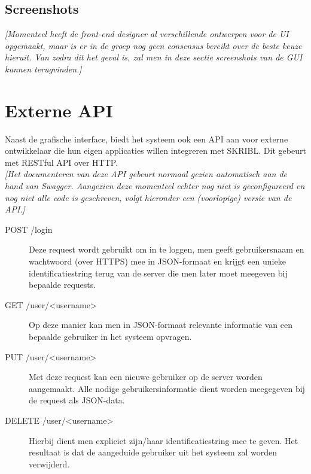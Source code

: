\documentclass{article}
\begin{document}
\subsection{Screenshots}

\textit{[Momenteel heeft de front-end designer al verschillende ontwerpen voor de UI opgemaakt, maar is er in de groep nog geen consensus bereikt over de beste keuze hieruit. Van zodra dit het geval is, zal men in deze sectie screenshots van de GUI kunnen terugvinden.]}

\clearpage

\section{Externe API}

Naast de grafische interface, biedt het systeem ook een API aan voor externe ontwikkelaar die hun eigen applicaties willen integreren met SKRIBL. Dit gebeurt met RESTful API over HTTP. \\

\textit{[Het documenteren van deze API gebeurt normaal gezien automatisch aan de hand van Swagger. Aangezien deze momenteel echter nog niet is geconfigureerd en nog niet alle code is geschreven, volgt hieronder een (voorlopige) versie van de API.]} \\

\begin{description}
\item[POST /login] Deze request wordt gebruikt om in te loggen, men geeft gebruikersnaam en wachtwoord (over HTTPS) mee in JSON-formaat en krijgt een unieke identificatiestring terug van de server die men later moet meegeven bij bepaalde requests.

\item[GET /user/<username>] Op deze manier kan men in JSON-formaat relevante informatie van een bepaalde gebruiker in het systeem opvragen.

\item[PUT /user/<username>] Met deze request kan een nieuwe gebruiker op de server worden aangemaakt. Alle nodige gebruikersinformatie dient worden meegegeven bij de request als JSON-data.

\item[DELETE /user/<username>] Hierbij dient men expliciet zijn/haar identificatiestring mee te geven. Het resultaat is dat de aangeduide gebruiker uit het systeem zal worden verwijderd.

\end{description}
\end{document}
